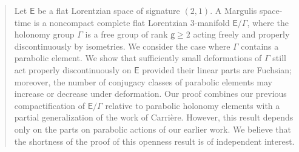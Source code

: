 \documentclass{amsart}
\numberwithin{equation}{section}
\newcommand\Lspace{\mathsf E}
\newcommand{\bg}{\mathsf{g}}
\theoremstyle{definition}
\theoremstyle{remark}
\begin{document}



%




\begin{abstract}
	Let $\Lspace$ be a flat Lorentzian space of signature $(2,1)$. A Margulis space-time is a noncompact complete flat Lorentzian $3$-manifold $\Lspace/\Gamma$, where the holonomy group $\Gamma$ is a free group of rank $\bg\ge 2$ acting freely and properly discontinuously by isometries.
	We consider the case where $\Gamma$ contains a parabolic element. We show that sufficiently small deformations of $\Gamma$ still act properly discontinuously on $\Lspace$ provided their linear parts are Fuchsian; moreover, the number of conjugacy classes 
of parabolic elements may increase or decrease under deformation.
	Our proof combines our previous compactification of $\Lspace/\Gamma$ relative to 
parabolic holonomy elements with a partial generalization of the work of Carri\`ere. However, this result depends only on the parts on parabolic actions of our earlier work. We believe that the shortness of the proof of this openness result is of independent interest. 
\end{abstract}
	
	



\end{document}
